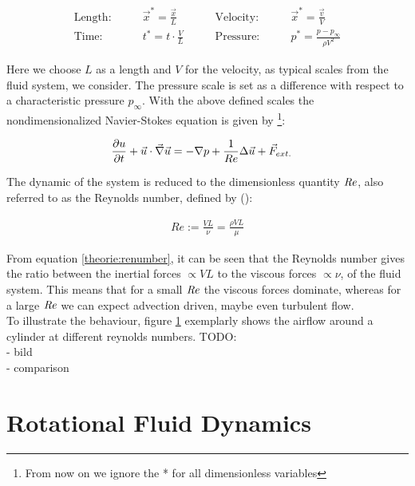 \begin{align}
    \text{Length:}\qquad &  \vec{x}^* = \frac{\vec{x}}{L}  & \qquad \text{Velocity:}\qquad& \vec{x}^* = \frac{\vec{v}}{V}\\
    \text{Time:}  \qquad & t^* = t \cdot \frac{V}{L}      & \qquad  \text{Pressure:}\qquad & p^* = \frac{p - p_\infty}{\rho V^2}
\end{align}

Here we choose $L$ as a length and $V$ for the velocity, as typical scales from the fluid system, we consider.
The pressure scale is set as a difference with respect to a characteristic pressure $p_\infty$.
With the above defined scales the nondimensionalized Navier-Stokes equation is given by \footnote{
From now on we ignore the * for all dimensionless variables }:

\begin{align}
    \pdn[u]{t} + \vec{u} \cdot \vec{\nabla} \vec{u} &= -\nabla p + \frac{1}{Re} \Delta \vec{u} + \vec{F}_{ext.}
\end{align}

The dynamic of the system is reduced to the dimensionless quantity $\Rey$, also referred to as the Reynolds number,
defined by (\citep{Kundu2012}):

\begin{align}
    \label{theorie:renumber}
    Re := \frac{VL}{\nu} = \frac{\rho VL}{\mu}
\end{align}

\newpage

From equation \ref{theorie:renumber}, it can be seen that the Reynolds number gives the ratio between the inertial forces $\propto VL$
to the viscous forces $\propto \nu$, of the fluid system.
This means that for a small $\Rey$ the viscous forces dominate, whereas for a large $\Rey$ we can expect advection driven, maybe even turbulent flow.\\
To illustrate the behaviour, figure \ref{theorie:re_example} exemplarly shows the airflow around a cylinder at different reynolds numbers.
TODO:\\
- bild\\
- comparison\\

\begin{figure}[!pb]
    \label{theorie:re_example}
  \centering
\end{figure}
\newpage

\section{Rotational Fluid Dynamics}

